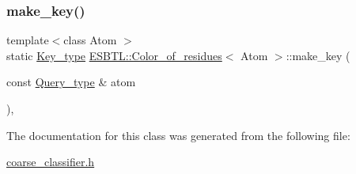 \subsubsection{\texorpdfstring{make\+\_\+key()}{make\_key()}}
{\footnotesize\ttfamily template$<$class Atom $>$ \\
static \hyperlink{classESBTL_1_1Color__of__residues_a38d3b296b236f785e36b7aba5a370f53}{Key\+\_\+type} \hyperlink{classESBTL_1_1Color__of__residues}{E\+S\+B\+T\+L\+::\+Color\+\_\+of\+\_\+residues}$<$ Atom $>$\+::make\+\_\+key (\begin{DoxyParamCaption}\item[{const \hyperlink{classESBTL_1_1Color__of__residues_a330e9e55bf0f4610807939a480d0024e}{Query\+\_\+type} \&}]{atom }\end{DoxyParamCaption})\hspace{0.3cm}{\ttfamily [inline]}, {\ttfamily [static]}}



The documentation for this class was generated from the following file\+:\begin{DoxyCompactItemize}
\item 
\hyperlink{coarse__classifier_8h}{coarse\+\_\+classifier.\+h}\end{DoxyCompactItemize}
